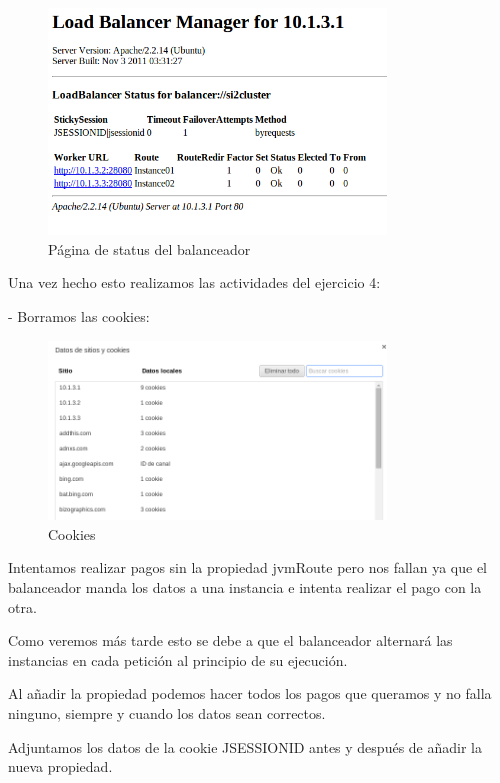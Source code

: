 \documentclass[a4paper, 10pt]{article}
\begin{document}
\begin{figure}[hbtp]
	\centering
	\includegraphics[width=0.8\textwidth]{../../P3/pantallazos/manager.png}
	\caption { Página de status del balanceador }
\end{figure}


Una vez hecho esto realizamos las actividades del ejercicio 4:

- Borramos las cookies:
\begin{figure}[hbtp]
	\centering
	\includegraphics[width=0.8\textwidth]{../../P3/pantallazos/ej4_cookies.png}
	\caption { Cookies }
\end{figure}
\newpage
Intentamos realizar pagos sin la propiedad jvmRoute pero nos fallan ya que el balanceador manda los datos a una instancia e intenta realizar el pago con la otra.

Como veremos más tarde esto se debe a que el balanceador alternará las instancias en cada petición al principio de su ejecución.

Al añadir la propiedad podemos hacer todos los pagos que queramos y no falla ninguno, siempre y cuando los datos sean correctos.

Adjuntamos los datos de la cookie JSESSIONID antes y después de añadir la nueva propiedad.
\end{document}

